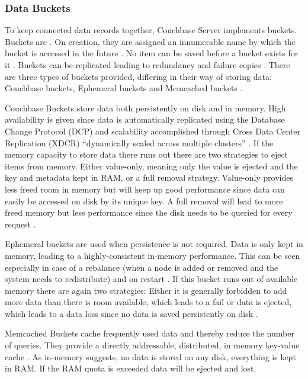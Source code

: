 \subsubsection{Data Buckets}
To keep connected data records together, Couchbase Server implements buckets. Buckets are . On creation, they are assigned an innumerable name by which the bucket is accessed in the future \parencite{couchbaseDocuBuckMemStor}. No item can be saved before a bucket exists for it \parencite{couchbaseDocuMemory}. Buckets can be replicated leading to redundancy and failure copies \parencite{couchbaseWeb}. There are three types of buckets provided, differing in their way of storing data: Couchbase buckets, Ephemeral buckets and Memcached buckets \parencite{couchbaseDocuMemory}. 

Couchbase Buckets store data both persistently on disk and in memory. High availability is given since data is automatically replicated using the Database Change Protocol (DCP) and scalability accomplished through Cross Data Center Replication (XDCR) \enquote{dynamically scaled across multiple clusters} \parencite{couchbaseDocuBuckets}. If the memory capacity to store data there runs out there are two strategies to eject items from memory. Either value-only, meaning only the value is ejected and the key and metadata kept in RAM, or a full removal strategy. Value-only provides less freed room in memory but will keep up good performance since data can easily be accessed on disk by its unique key. A full removal will lead to more freed memory but less performance since the disk needs to be queried for every request \parencite{couchbaseDocuBuckets}.

Ephemeral buckets are used when persistence is not required. Data is only kept in memory, leading to a highly-consistent in-memory performance. This can be seen especially in case of a rebalance (when a node is added or removed and the system needs to redistribute) and on restart \parencite{couchbaseDocuBuckets}. If this bucket runs out of available memory there are again two strategies: Either it is generally forbidden to add more data than there is room available, which leads to a fail or data is ejected, which leads to a data loss since no data is saved persistently on disk \parencite{couchbaseDocuBuckets}. 

Memcached Buckets cache frequently used data and thereby reduce the number of queries. They provide a directly addressable, distributed, in memory key-value cache \parencite{couchbaseDocuBuckets}. As in-memory suggests, no data is stored on any disk, everything is kept in RAM. If the RAM quota is exceeded data will be ejected and lost.

